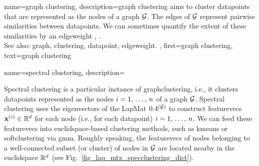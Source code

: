 {name={graph clustering},
	description={\Gls{graph} \gls{clustering} aims to 
		cluster \glspl{datapoint} that are represented as the nodes 
		of a \gls{graph} $\mathcal{G}$. The edges of $\mathcal{G}$ represent 
		pairwise similarities between \glspl{datapoint}. We can sometimes
		quantify the extent of these similarities by an \gls{edgeweight} \cite{FlowSpecClustering2021}, \cite{Luxburg2007}.
					\\ 
		See also: \gls{graph}, \gls{clustering}, \gls{datapoint}, \gls{edgeweight}. }, 
	first={graph clustering},
	text={graph clustering} 
}

{name={spectral clustering},
	description={Spectral \gls{clustering} is a particular instance of 
		\gls{graphclustering}, i.e., it clusters \glspl{datapoint} 
		represented as the nodes $i=1, \,\ldots, \,n$ of a \gls{graph} $\mathcal{G}$. 
		Spectral \gls{clustering} uses the \glspl{eigenvector} of the \gls{LapMat} $0.4^{(\mathcal{G})}$ 
		to construct \glspl{featurevec} ${\bf x}^{(i)} \in \mathbb{R}^{d}$ 
		for each node (i.e., for each \gls{datapoint}) $i=1, \,\ldots, \,n$. We can feed these \glspl{featurevec} 
		into \gls{euclidspace}-based \gls{clustering} methods, such as \gls{kmeans} 
		or \gls{softclustering} via \gls{gmm}. Roughly speaking, the \glspl{featurevec} of nodes 
		belonging to a well-connected subset (or \gls{cluster}) of nodes in $\mathcal{G}$ are located 
		nearby in the \gls{euclidspace} $\mathbb{R}^{d}$ (see Fig.\ \ref{fig_lap_mtx_specclustering_dict}). 
		\begin{figure}[H]
			\begin{center}
				\begin{minipage}{0.4\textwidth}
\end{minipage}
\end{center}
\end{figure}}}
